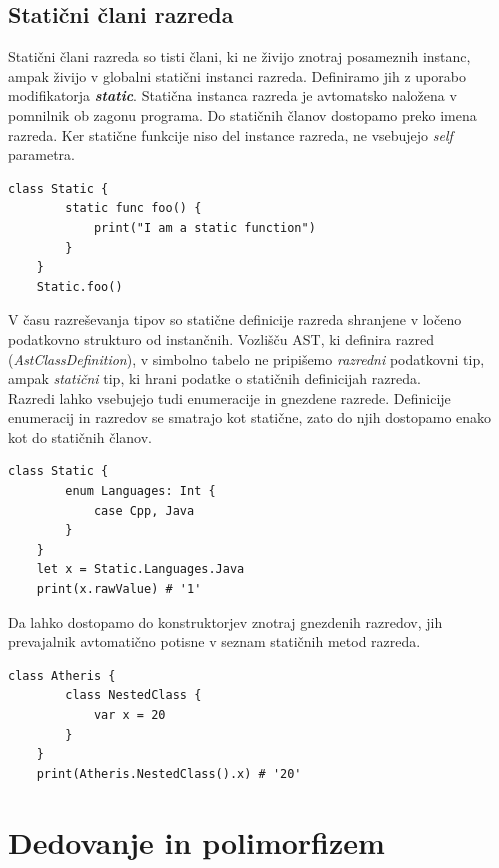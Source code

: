 \documentclass[a4paper, 12p]{book}
\begin{document}
\subsection{Statični člani razreda}

Statični člani razreda so tisti člani, ki ne živijo znotraj posameznih instanc, ampak živijo v globalni statični instanci razreda. Definiramo jih z uporabo modifikatorja \textit{\textbf{static}}. Statična instanca razreda je avtomatsko naložena v pomnilnik ob zagonu programa. Do statičnih članov dostopamo preko imena razreda. Ker statične funkcije niso del instance razreda, ne vsebujejo \textit{self} parametra.

\begin{lstlisting}[caption={Klicanje statične funkcije.}, captionpos=b]
    class Static {
        static func foo() {
            print("I am a static function")
        }
    } 
	Static.foo()
\end{lstlisting}

\indent V času razreševanja tipov so statične definicije razreda shranjene v ločeno podatkovno strukturo od instančnih. Vozlišču AST, ki definira razred (\textit{AstClassDefinition}), v simbolno tabelo ne pripišemo \textit{razredni} podatkovni tip, ampak \textit{statični} tip, ki hrani podatke o statičnih definicijah razreda. \\
\indent Razredi lahko vsebujejo tudi enumeracije in gnezdene razrede. Definicije enumeracij in razredov se smatrajo kot statične, zato do njih dostopamo enako kot do statičnih članov. 

\begin{lstlisting}[caption={Gnezdena enumeracija.}, captionpos=b]
	class Static {
	    enum Languages: Int {
	        case Cpp, Java
	    }
	}
	let x = Static.Languages.Java
	print(x.rawValue) # '1'
\end{lstlisting}

Da lahko dostopamo do konstruktorjev znotraj gnezdenih razredov, jih prevajalnik avtomatično potisne v seznam statičnih metod razreda.

\begin{lstlisting}[caption={Gnezden razred.}, captionpos=b]
	class Atheris {
	    class NestedClass {
	        var x = 20
	    }
	}
	print(Atheris.NestedClass().x) # '20'
\end{lstlisting}

\section{Dedovanje in polimorfizem}
\end{document}
